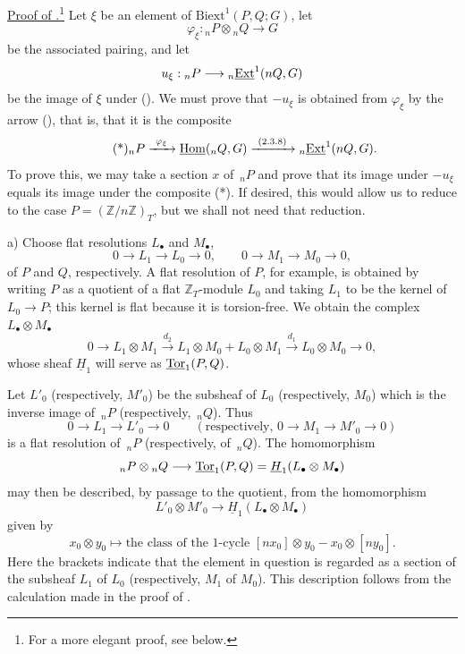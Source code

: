 
\medskip
\noindent\underline{Proof of .}\footnote{For a more elegant
proof, see  below.}
Let $\xi$ be an element of $\mathrm{Biext}^1(P,Q;G)$, let
\[
 \varphi_\xi:{}_nP\otimes{}_nQ\longrightarrow G
\]
be the associated pairing, and let
\[
 u_\xi:{}_nP\longrightarrow{}_n\uExt^1(nQ,G)
\]
be the image of $\xi$ under ().  We must prove that $-u_\xi$ is
obtained from $\varphi_\xi$ by the arrow (), that is, that it is
the composite
\begin{equation}\tag{*}
 {}_nP
 \xrightarrow{\ \varphi_\xi\ }
 \uHom({}_nQ,G)
 \xrightarrow{\ (\SGARefLink{sga7.sga7i.eviii.n2-3-8}{2.3.8})\ }
 {}_n\uExt^1(nQ,G).
\end{equation}
To prove this, we may take a section $x$ of $\,{}_nP$ and prove that
its image under $-u_\xi$ equals its image under the composite (*).
If desired, this would allow us to reduce to the case
$P=(\mathbb Z/n\mathbb Z)_T$, but we shall not need that reduction.

\medskip
\noindent a) Choose flat resolutions $L_\bullet$ and $M_\bullet$,
\[
 0\longrightarrow L_1\longrightarrow L_0\longrightarrow0,
 \qquad
 0\longrightarrow M_1\longrightarrow M_0\longrightarrow0,
\]
of $P$ and $Q$, respectively.  A flat resolution of $P$, for example,
is obtained by writing $P$ as a quotient of a flat
$\mathbb Z_T$-module $L_0$ and taking $L_1$ to be the kernel of
$L_0\longrightarrow P$; this kernel is flat because it is
torsion-free.  We obtain the complex $L_\bullet\otimes M_\bullet$
\[
 0\longrightarrow L_1\otimes M_1
 \xrightarrow{d_2}
 L_1\otimes M_0+L_0\otimes M_1
 \xrightarrow{d_1}
 L_0\otimes M_0
 \longrightarrow0,
\]
whose sheaf $\underline H_1$ will serve as $\uTor_1(P,Q)$.

Let $L'_0$ (respectively, $M'_0$) be the subsheaf of $L_0$
(respectively, $M_0$) which is the inverse image of $\,{}_nP$
(respectively, $\,{}_nQ$).  Thus
\[
 0\longrightarrow L_1\longrightarrow L'_0\longrightarrow0
 \qquad
 \left(\text{respectively, }
 0\longrightarrow M_1\longrightarrow M'_0\longrightarrow0\right)
\]
is a flat resolution of $\,{}_nP$ (respectively, of $\,{}_nQ$).  The
homomorphism
\[
 {}_nP\otimes{}_nQ
 \longrightarrow
 \uTor_1(P,Q)=\underline H_1(L_\bullet\otimes M_\bullet)
\]
may then be described, by passage to the quotient, from the
homomorphism
\[
 L'_0\otimes M'_0
 \longrightarrow
 \underline H_1(L_\bullet\otimes M_\bullet)
\]
given by
\[
 x_0\otimes y_0
 \longmapsto
 \text{the class of the $1$-cycle }
 [nx_0]\otimes y_0-x_0\otimes[ny_0].
\]
Here the brackets indicate that the element in question is regarded
as a section of the subsheaf $L_1$ of $L_0$ (respectively, $M_1$ of
$M_0$).  This description follows from the calculation made in the
proof of .

